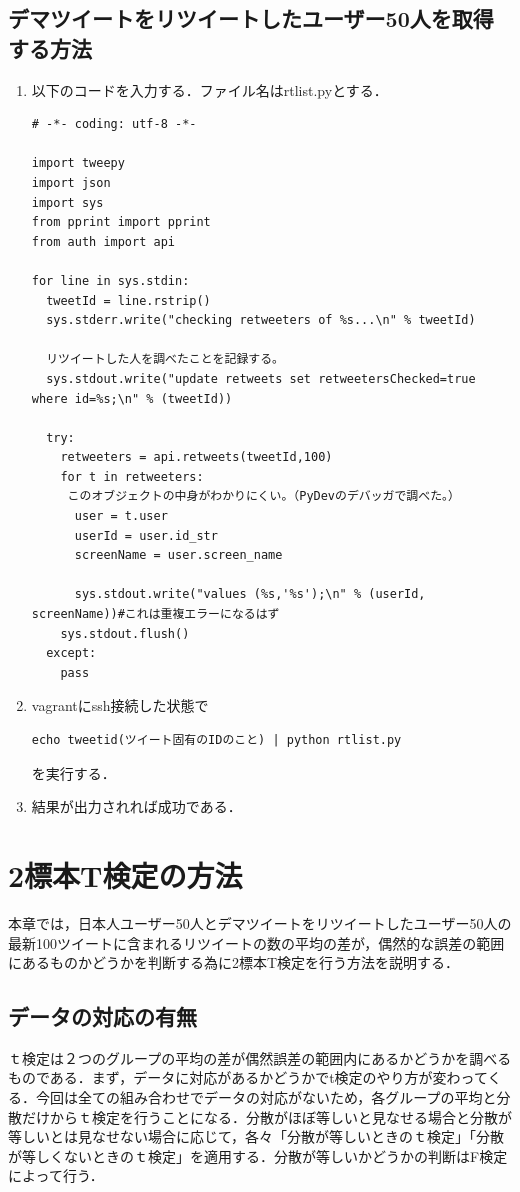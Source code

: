 \subsection{デマツイートをリツイートしたユーザー50人を取得する方法}
\begin{enumerate}
\item 以下のコードを入力する．ファイル名はrtlist.pyとする．
\begin{verbatim}
# -*- coding: utf-8 -*-

import tweepy
import json
import sys
from pprint import pprint
from auth import api

for line in sys.stdin:
  tweetId = line.rstrip()
  sys.stderr.write("checking retweeters of %s...\n" % tweetId)

  リツイートした人を調べたことを記録する。
  sys.stdout.write("update retweets set retweetersChecked=true where id=%s;\n" % (tweetId))

  try:
    retweeters = api.retweets(tweetId,100)
    for t in retweeters:
     このオブジェクトの中身がわかりにくい。（PyDevのデバッガで調べた。）
      user = t.user
      userId = user.id_str
      screenName = user.screen_name

      sys.stdout.write("values (%s,'%s');\n" % (userId, screenName))#これは重複エラーになるはず
    sys.stdout.flush()
  except:
    pass
\end{verbatim}
\item vagrantにssh接続した状態で
\begin{verbatim}
echo tweetid(ツイート固有のIDのこと) | python rtlist.py
\end{verbatim}
を実行する．
\item 結果が出力されれば成功である．
\end{enumerate}

\section{2標本T検定の方法}
本章では，日本人ユーザー50人とデマツイートをリツイートしたユーザー50人の最新100ツイートに含まれるリツイートの数の平均の差が，偶然的な誤差の範囲にあるものかどうかを判断する為に2標本T検定を行う方法を説明する．

\subsection{データの対応の有無}
ｔ検定は２つのグループの平均の差が偶然誤差の範囲内にあるかどうかを調べるものである．まず，データに対応があるかどうかでt検定のやり方が変わってくる．今回は全ての組み合わせでデータの対応がないため，各グループの平均と分散だけからｔ検定を行うことになる．分散がほぼ等しいと見なせる場合と分散が等しいとは見なせない場合に応じて，各々「分散が等しいときのｔ検定」「分散が等しくないときのｔ検定」を適用する．分散が等しいかどうかの判断はF検定によって行う．

